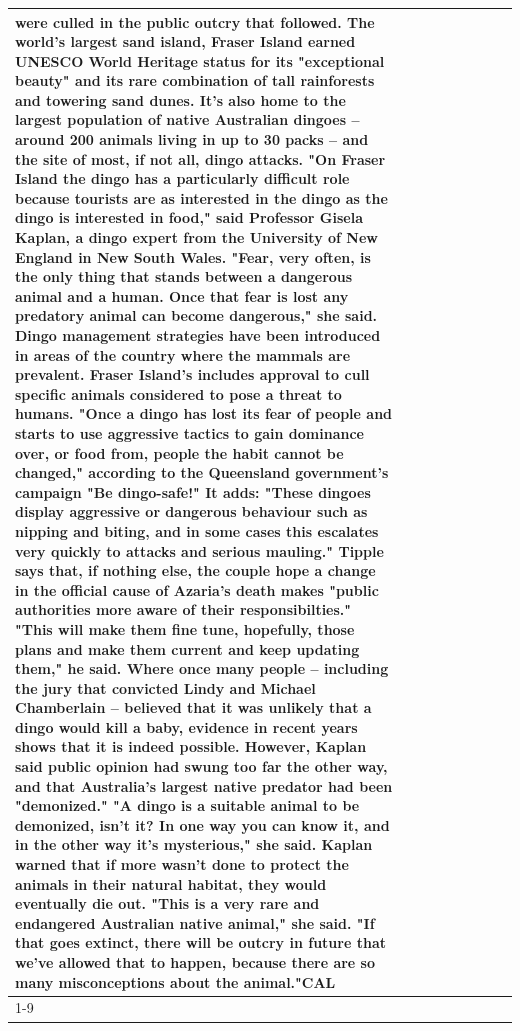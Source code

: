 \begin{table}[H]
\begin{tabular}{lllrlllll}
were culled in the public outcry that followed. The world's largest sand island, Fraser Island earned UNESCO World Heritage status for its "exceptional beauty" and its rare combination of tall rainforests and towering sand dunes. It's also home to the largest population of native Australian dingoes -- around 200 animals living in up to 30 packs -- and the site of most, if not all, dingo attacks. "On Fraser Island the dingo has a particularly difficult role because tourists are as interested in the dingo as the dingo is interested in food," said Professor Gisela Kaplan, a dingo expert from the University of New England in New South Wales. "Fear, very often, is the only thing that stands between a dangerous animal and a human. Once that fear is lost any predatory animal can become dangerous," she said. Dingo management strategies have been introduced in areas of the country where the mammals are prevalent. Fraser Island's includes approval to cull specific animals considered to pose a threat to humans. "Once a dingo has lost its fear of people and starts to use aggressive tactics to gain dominance over, or food from, people the habit cannot be changed," according to the Queensland government's campaign "Be dingo-safe!" It adds: "These dingoes display aggressive or dangerous behaviour such as nipping and biting, and in some cases this escalates very quickly to attacks and serious mauling." Tipple says that, if nothing else, the couple hope a change in the official cause of Azaria's death makes "public authorities more aware of their responsibilties." "This will make them fine tune, hopefully, those plans and make them current and keep updating them," he said. Where once many people -- including the jury that convicted Lindy and Michael Chamberlain -- believed that it was unlikely that a dingo would kill a baby, evidence in recent years shows that it is indeed possible. However, Kaplan said public opinion had swung too far the other way, and that Australia's largest native predator had been "demonized." "A dingo is a suitable animal to be demonized, isn't it? In one way you can know it, and in the other way it's mysterious," she said. Kaplan warned that if more wasn't done to protect the animals in their natural habitat, they would eventually die out. "This is a very rare and endangered Australian native animal," she said. "If that goes extinct, there will be outcry in future that we've allowed that to happen, because there are so many misconceptions about the animal."CAL \\
\cline{1-9}

\end{tabular}
\end{table}
